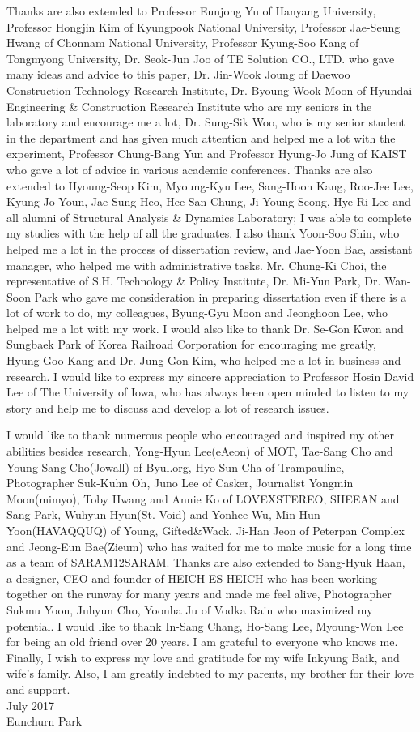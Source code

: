 Thanks are also extended to Professor Eunjong Yu of Hanyang University, Professor Hongjin Kim of Kyungpook National University, Professor Jae-Seung Hwang of Chonnam National University, Professor Kyung-Soo Kang of Tongmyong University, Dr. Seok-Jun Joo of TE Solution CO., LTD. who gave many ideas and advice to this paper, Dr. Jin-Wook Joung of Daewoo Construction Technology Research Institute, Dr. Byoung-Wook Moon of Hyundai Engineering \& Construction Research Institute who are my seniors in the laboratory and encourage me a lot, Dr. Sung-Sik Woo, who is my senior student in the department and has given much attention and helped me a lot with the experiment, Professor Chung-Bang Yun and Professor Hyung-Jo Jung of KAIST who gave a lot of advice in various academic conferences. Thanks are also extended to Hyoung-Seop Kim, Myoung-Kyu Lee, Sang-Hoon Kang, Roo-Jee Lee, Kyung-Jo Youn, Jae-Sung Heo, Hee-San Chung, Ji-Young Seong, Hye-Ri Lee and all alumni of Structural Analysis \& Dynamics Laboratory; I was able to complete my studies with the help of all the graduates. I also thank Yoon-Soo Shin, who helped me a lot in the process of dissertation review, and Jae-Yoon Bae, assistant manager, who helped me with administrative tasks. Mr. Chung-Ki Choi, the representative of S.H. Technology \& Policy Institute, Dr. Mi-Yun Park, Dr. Wan-Soon Park who gave me consideration in preparing dissertation even if there is a lot of work to do, my colleagues, Byung-Gyu Moon and Jeonghoon Lee, who helped me a lot with my work. I would also like to thank Dr. Se-Gon Kwon and Sungbaek Park of Korea Railroad Corporation for encouraging me greatly, Hyung-Goo Kang and Dr. Jung-Gon Kim, who helped me a lot in business and research. I would like to express my sincere appreciation to Professor Hosin David Lee of The University of Iowa, who has always been open minded to listen to my story and help me to discuss and develop a lot of research issues.

I would like to thank numerous people who encouraged and inspired my other abilities besides research, Yong-Hyun Lee(eAeon) of MOT, Tae-Sang Cho and Young-Sang Cho(Jowall) of Byul.org, Hyo-Sun Cha of Trampauline, Photographer Suk-Kuhn Oh, Juno Lee of Casker, Journalist Yongmin Moon(mimyo), Toby Hwang and Annie Ko of LOVEXSTEREO, SHEEAN and Sang Park, Wuhyun Hyun(St. Void) and Yonhee Wu, Min-Hun Yoon(HAVAQQUQ) of Young, Gifted\&Wack, Ji-Han Jeon of Peterpan Complex and Jeong-Eun Bae(Zieum) who has waited for me to make music for a long time as a team of SARAM12SARAM. Thanks are also extended to Sang-Hyuk Haan, a designer, CEO and founder of HEICH ES HEICH who has been working together on the runway for many years and made me feel alive, Photographer Sukmu Yoon, Juhyun Cho, Yoonha Ju of Vodka Rain who maximized my potential. I would like to thank In-Sang Chang, Ho-Sang Lee, Myoung-Won Lee for being an old friend over 20 years. I am grateful to everyone who knows me. Finally, I wish to express my love and gratitude for my wife Inkyung Baik, and wife's family. Also, I am greatly indebted to my parents, my brother for their love and support.
\\
\hspace*{\fill} July 2017\\
\hspace*{\fill} Eunchurn Park